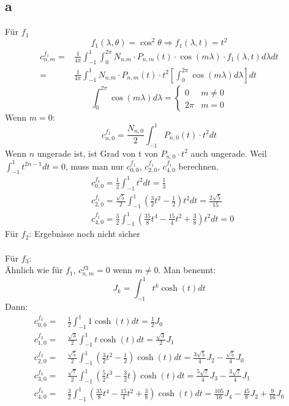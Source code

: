 \subsection{a}
Für $f_1$
\begin{equation}
	f_1(\lambda,\theta) = \cos^2\theta \Longrightarrow f_1(\lambda,t) = t^2 
\end{equation}
\begin{align}
	c_{n,m}^{f_1} = & \frac{1}{4\pi} \int_{-1}^{1} \int_{0}^{2\pi} N_{n.m} \cdot P_{n,m}(t) \cdot \cos(m\lambda) \cdot f_1(\lambda,t) d\lambda dt \\
	= & \frac{1}{4\pi} \int_{-1}^{1} N_{n.m} \cdot P_{n,m}(t) \cdot t^2  \left[\int_{0}^{2\pi} \cos(m\lambda) d\lambda\right]  dt
\end{align}
\begin{equation}
	\int_{0}^{2\pi} \cos(m\lambda) d\lambda = \begin{cases}
	0 & m \neq 0 \\
	2\pi & m=0
	\end{cases}
\end{equation}
Wenn $m=0$:
\begin{equation}
	c_{n,0}^{f_1} = \frac{N_{n,0}}{2} \int_{-1}^{1} P_{n,0}(t) \cdot t^2 dt
\end{equation}
Wenn $n$ ungerade ist, ist Grad von t von $P_{n,0}\cdot t^2$ auch ungerade. Weil $\int_{-1}^{1} t^{2n-1}dt = 0$, muss man nur $c_{0,0}^{f_1}$, $c_{2,0}^{f_1}$, $c_{4,0}^{f_1}$ berechnen.
\begin{align}
	& c_{0,0}^{f_1} = \frac{1}{2} \int_{-1}^{1} t^2 dt = \frac{1}{3} \\
	& c_{2,0}^{f_1} = \frac{\sqrt{5}}{2} \int_{-1}^{1} (\frac{3}{2}t^2-\frac{1}{2})t^2dt = \frac{2\sqrt{5}}{15} \\
	& c_{4,0}^{f_1} = \frac{3}{2} \int_{-1}^{1} (\frac{35}{8}t^4 - \frac{15}{4}t^2 + \frac{3}{8})t^2dt = 0
\end{align}
Für $f_2$: 
Ergebnisse noch nicht sicher \\\\
Für $f_3$:\\
Ähnlich wie für $f_1$, $c_{n,m}^{f3} = 0$ wenn $m \neq 0$. Man benennt:
\begin{equation*}
	J_k = \int_{-1}^{1} t^k \cosh (t) dt
\end{equation*}
Dann:
\begin{align}
	c_{0,0}^{f_3} = \ & \frac{1}{2} \int_{-1}^{1} 1 \cosh (t) dt = \frac{1}{2} J_0 \\
	c_{1,0}^{f_3} = \ & \frac{\sqrt{3}}{2} \int_{-1}^{1} t \cosh (t) dt = \frac{\sqrt{3}}{2}J_1 \\
	c_{2,0}^{f_3} = \ & \frac{\sqrt{5}}{2} \int_{-1}^{1} (\frac{3}{2}t^2-\frac{1}{2})\cosh (t) dt = \frac{3\sqrt{5}}{4}J_2-\frac{\sqrt{5}}{4} J_0 \\
	c_{3,0}^{f_3} = \ & \frac{\sqrt{7}}{2} \int_{-1}^{1} (\frac{5}{2}t^3 - \frac{3}{2}t)\cosh (t) dt = \frac{5\sqrt{7}}{4}J_3 - \frac{3\sqrt{7}}{4} J_1 \\
	c_{4,0}^{f_3} = \ & \frac{3}{2} \int_{-1}^{1} (\frac{35}{8}t^4 - \frac{15}{4}t^2 + \frac{3}{8}) \cosh (t) dt = \frac{105}{16}J_4 - \frac{45}{8}J_2 + \frac{9}{16}J_0
\end{align}
